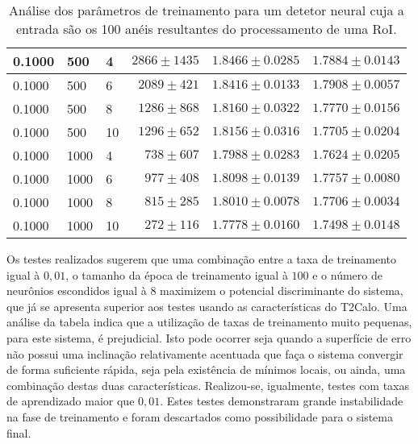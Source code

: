 \begin{table}
\begin{center}
{\begin{tabular}{|l|l|l|r|r|r|}
0.1000 & 500 & 4 & $2866\pm1435$ & $1.8466\pm0.0285$ & $1.7884\pm0.0143$ \\ \hline
0.1000 & 500 & 6 & $2089\pm421$ & $1.8416\pm0.0133$ & $1.7908\pm0.0057$ \\ \hline
0.1000 & 500 & 8 & $1286\pm868$ & $1.8160\pm0.0322$ & $1.7770\pm0.0156$ \\ \hline
0.1000 & 500 & 10 & $1296\pm652$ & $1.8156\pm0.0316$ & $1.7705\pm0.0204$ \\ \hline
0.1000 & 1000 & 4 & $738\pm607$ & $1.7988\pm0.0283$ & $1.7624\pm0.0205$ \\ \hline
0.1000 & 1000 & 6 & $977\pm408$ & $1.8098\pm0.0139$ & $1.7757\pm0.0080$ \\ \hline
0.1000 & 1000 & 8 & $815\pm285$ & $1.8010\pm0.0078$ & $1.7706\pm0.0034$ \\ \hline
0.1000 & 1000 & 10 & $272\pm116$ & $1.7778\pm0.0160$ & $1.7498\pm0.0148$ \\ \hline

\end{tabular}}
\renewcommand{\baselinestretch}{1.0}
\end{center}
\caption{Análise dos parâmetros de treinamento para um detetor neural cuja a
entrada são os 100 anéis resultantes do processamento de uma RoI.}
\label{tab:ringer-param-optimization}
\end{table}

Os testes realizados sugerem que uma combinação entre a taxa de treinamento
igual à $0,01$, o tamanho da época de treinamento igual à $100$ e o número de
neurônios escondidos igual à $8$ maximizem o potencial discriminante do
sistema, que já se apresenta superior aos testes usando as características do
T2Calo. Uma análise da tabela indica que a utilização de taxas de treinamento
muito pequenas, para este sistema, é prejudicial. Isto pode ocorrer seja
quando a superfície de erro não possui uma inclinação relativamente acentuada
que faça o sistema convergir de forma suficiente rápida, seja pela existência
de mínimos locais, ou ainda, uma combinação destas duas
características. Realizou-se, igualmente, testes com taxas de aprendizado
maior que $0,01$. Estes testes demonstraram grande instabilidade na fase de
treinamento e foram descartados como possibilidade para o sistema final.


